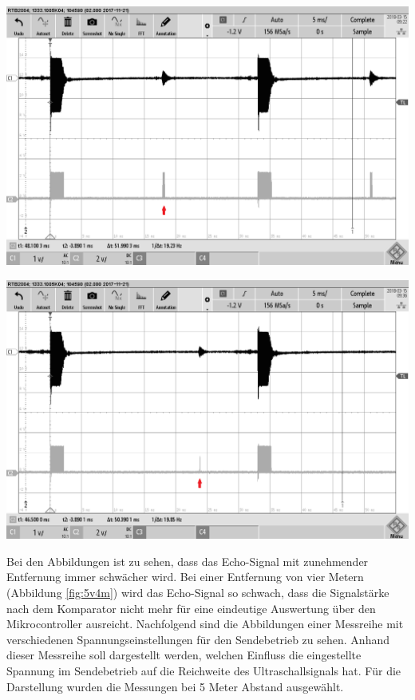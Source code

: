 \begin{minipage}{0.5\textwidth}
\includegraphics[width=1\textwidth%
]{Abbildungen/MessungenP2/5V/3mb.PNG}
\label{fig:5v3m}
\end{minipage}
\begin{minipage}{0.5\textwidth}
\includegraphics[width=1\textwidth%
]{Abbildungen/MessungenP2/5V/4mb.PNG}
\label{fig:5v4m}
\end{minipage}
Bei den Abbildungen ist zu sehen, dass das Echo-Signal mit zunehmender Entfernung immer schwächer wird. Bei einer Entfernung von vier Metern (Abbildung \ref{fig:5v4m}) wird das Echo-Signal so schwach, dass die Signalstärke nach dem Komparator nicht mehr für eine eindeutige Auswertung über den Mikrocontroller ausreicht. Nachfolgend sind die Abbildungen einer Messreihe mit verschiedenen Spannungseinstellungen für den Sendebetrieb zu sehen. Anhand dieser Messreihe soll dargestellt werden, welchen Einfluss die eingestellte Spannung im Sendebetrieb auf die Reichweite des Ultraschallsignals hat. Für die Darstellung wurden die Messungen bei 5 Meter Abstand ausgewählt.\\
